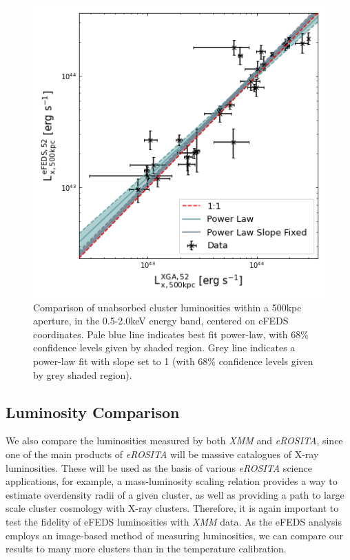 \documentclass[fleqn,usenatbib]{mnras}
\begin{document}
\begin{figure}
    \centering
    \includegraphics[width=0.95\columnwidth]{images/efeds_xcs_l500cal.png}
    \caption[]{Comparison of unabsorbed cluster luminosities within a 500kpc aperture, in the 0.5-2.0keV energy band, centered on eFEDS coordinates. Pale blue line indicates best fit power-law, with 68\% confidence levels given by shaded region. Grey line indicates a power-law fit with slope set to 1 (with 68\% confidence levels given by grey shaded region).}
    \label{fig:l500kpccomp}
\end{figure}

\subsection{Luminosity Comparison}
We also compare the luminosities measured by both {\em XMM} and {\em eROSITA}, since one of the main products of {\em eROSITA} will be massive catalogues of X-ray luminosities. These will be used as the basis of various {\em eROSITA} science applications, for example, a mass-luminosity scaling relation provides a way to estimate overdensity radii of a given cluster, as well as providing a path to large scale cluster cosmology with X-ray clusters.  Therefore, it is again important to test the fidelity of eFEDS luminosities with {\em XMM} data.  As the eFEDS analysis employs an image-based method of measuring luminosities, we can compare our results to many more clusters than in the temperature calibration.
\end{document}
